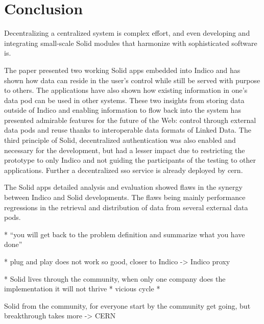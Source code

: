


\chapter{Conclusion}

Decentralizing a centralized system is complex effort, and even developing and integrating small-scale Solid modules that harmonize with sophisticated software is. 

The paper presented two working Solid apps embedded into Indico and has shown how data can reside in the user's control while still be served with purpose to others. The applications have also shown how existing information in one's data pod can be used in other systems. These two insights from storing data outside of Indico and enabling information to flow back into the system has presented admirable features for the future of the Web: control through external data pods and reuse thanks to interoperable data formats of Linked Data. The third principle of Solid, decentralized authentication was also enabled and necessary for the development, but had a lesser impact due to restricting the prototype to only Indico and not guiding the participants of the testing to other applications. Further a decentralized \gls{sso} service is already deployed by \gls{cern}.


The Solid apps detailed analysis and evaluation showed flaws in the synergy between Indico and Solid developments. The flaws being mainly performance regressions in the retrieval and distribution of data from several external data pods.



\vspace{3cm}

* “you will get back to the problem definition and summarize what you have done”

* plug and play does not work so good, closer to Indico -> Indico proxy

* Solid lives through the community, when only one company does the implementation it will not thrive
* vicious cycle
* 

Solid from the community, for everyone
start by the community
get going, but breakthrough takes more -> CERN

